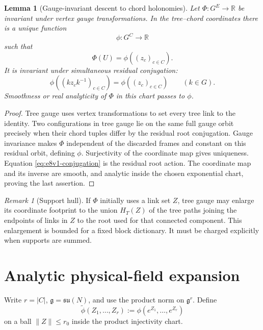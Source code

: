 \documentclass[11pt,oneside]{book}
\newtheorem{lemma}[theorem]{Lemma}
\theoremstyle{definition}
\theoremstyle{remark}
\newtheorem{remark}[theorem]{Remark}
\begin{document}
\begin{lemma}[Gauge-invariant descent to chord holonomies]
\label{lem:e8v1-descent}
Let \(\Phi:G^E\to\mathbb R\) be invariant under vertex gauge
transformations.  In the tree--chord coordinates there is a unique
function
\[
 \phi:G^C\longrightarrow\mathbb R                  \label{eq:e8v1-phi}
\]
such that
\[
 \Phi(U)=\phi((z_c)_{c\in C}).                       \label{eq:e8v1-descent}
\]
It is invariant under simultaneous residual conjugation:
\[
 \phi((kz_ck^{-1})_{c\in C})
 =
 \phi((z_c)_{c\in C})\qquad(k\in G).                \label{eq:e8v1-conjugation}
\]
Smoothness or real analyticity of \(\Phi\) in this chart passes to
\(\phi\).
\end{lemma}

\begin{proof}
Tree gauge uses vertex transformations to set every tree link to the
identity.  Two configurations in tree gauge lie on the same full gauge
orbit precisely when their chord tuples differ by the residual root
conjugation.  Gauge invariance makes \(\Phi\) independent of the
discarded frames and constant on this residual orbit, defining
\(\phi\).  Surjectivity of the coordinate map gives uniqueness.
Equation \eqref{eq:e8v1-conjugation} is the residual root action.
The coordinate map and its inverse are smooth, and analytic inside
the chosen exponential chart, proving the last assertion.
\end{proof}

\begin{remark}[Support hull]
\label{rem:e8v1-hull}
If \(\Phi\) initially uses a link set \(Z\), tree gauge may enlarge its
coordinate footprint to the union \(H_T(Z)\) of the tree paths joining
the endpoints of links in \(Z\) to the root used for that connected
component.  This enlargement is bounded for a fixed block dictionary.
It must be charged explicitly when supports are summed.
\end{remark}

\section{Analytic physical-field expansion}
\label{sec:e8v1-Taylor}

Write \(r=|C|\), \(\mathfrak g=\mathfrak{su}(N)\), and use the product
norm on \(\mathfrak g^r\).  Define
\[
 \widetilde\phi(Z_1,\ldots,Z_r)
 :=
 \phi(e^{Z_1},\ldots,e^{Z_r})                       \label{eq:e8v1-phitilde}
\]
on a ball \(\|Z\|\leq r_0\) inside the product injectivity chart.
\end{document}

